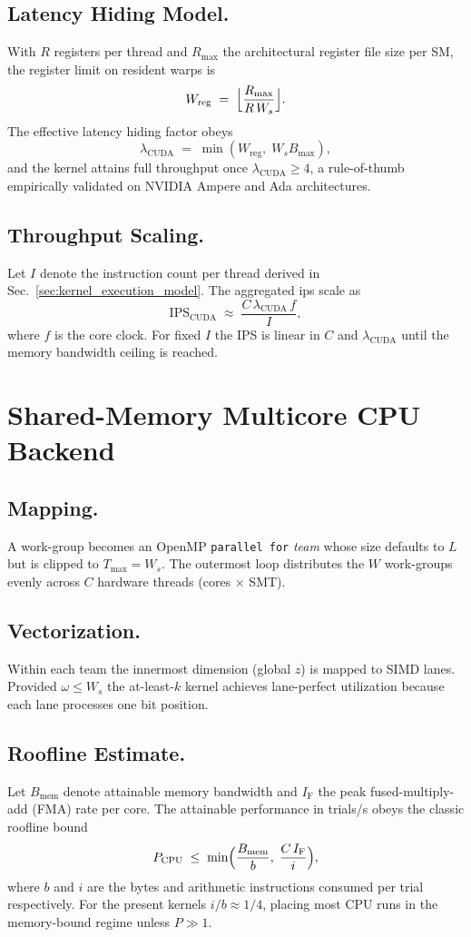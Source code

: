 \subsection{Latency Hiding Model.}  With $R$ registers per thread and
$R_{\max}$ the architectural register file size per SM, the register limit on
resident warps is
\[
  W_{\mathrm{reg}} \;=\; \Bigl\lfloor \frac{R_{\max}}{R\,W_s}\Bigr\rfloor.
\]
The effective latency hiding factor obeys
\[
  \lambda_\text{CUDA} \;=\; \min(W_{\mathrm{reg}},\; W_s B_{\max}),
\]
and the kernel attains full throughput once $\lambda_\text{CUDA}\ge 4$, a
rule-of-thumb empirically validated on NVIDIA Ampere and Ada architectures.

\subsection{Throughput Scaling.}  Let $I$ denote the instruction count per
thread derived in Sec.~\ref{sec:kernel_execution_model}.  The aggregated \acrfull{ips} scale as
\[
  \text{IPS}_{\text{CUDA}} \;\approx\; \frac{C\,\lambda_\text{CUDA}\,f}{I},
\]
where $f$ is the core clock.  For fixed $I$ the IPS is linear in $C$ and
$\lambda_\text{CUDA}$ until the memory bandwidth ceiling is reached.

\section{Shared-Memory Multicore CPU Backend}
\label{subsec:cpu_backend}

\subsection{Mapping.}  A work-group becomes an OpenMP \verb|parallel for|
\emph{team} whose size defaults to $L$ but is clipped to $T_{\max}=W_s$.  The
outermost loop distributes the $W$ work-groups evenly across $C$ hardware
threads (cores × SMT).

\subsection{Vectorization.}  Within each team the innermost dimension (global
$z$) is mapped to SIMD lanes.  Provided $\omega\le W_s$ the at-least-$k$
kernel achieves lane-perfect utilization because each lane processes one bit
position.

\subsection{Roofline Estimate.}  Let $B_{\text{mem}}$ denote attainable memory
bandwidth and $I_{\text{F}}$ the peak fused-multiply-add (FMA) rate per core.
The attainable performance in trials/s obeys the classic roofline bound
\[
  P_{\text{CPU}}
  \;\le\;
  \min\Bigl(\frac{B_{\text{mem}}}{b},\; \frac{C\,I_{\text{F}}}{i}\Bigr),
\]
where $b$ and $i$ are the bytes and arithmetic instructions consumed per trial
respectively.  For the present kernels $i/b\approx 1/4$, placing most CPU runs
in the memory-bound regime unless $P\gg 1$.


